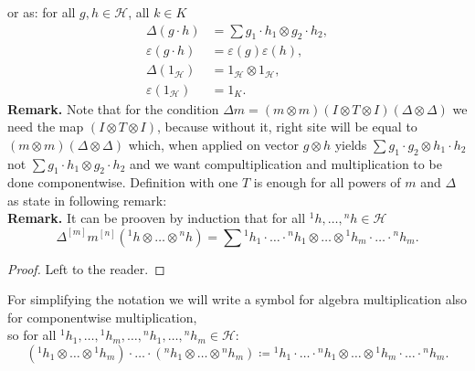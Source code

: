 \documentclass[a4paper, 12pt]{report}
\begin{document}
or as: for all $g, h \in \mathcal{H}$, all $k \in K$
\begin{align*}
\Delta(g \cdot h) &= \sum g_1 \cdot h_1 \otimes g_2 \cdot h_2, \\
\varepsilon(g \cdot h) &= \varepsilon(g)\varepsilon(h), \\
\Delta (1_\mathcal{H}) &= 1_\mathcal{H} \otimes 1_\mathcal{H}, \\
\varepsilon (1_\mathcal{H}) &= 1_K.
\end{align*}
\textbf{Remark. } Note that for the condition
$\Delta m = (m\otimes m)(I \otimes T \otimes I)(\Delta \otimes \Delta)$
we need the map $(I \otimes T \otimes I)$, because without it, right site will be equal to
$(m \otimes m)(\Delta \otimes \Delta)$ which, when applied on vector $g \otimes h$ yields
$\displaystyle\sum g_1 \cdot g_2 \otimes h_1 \cdot h_2$ not $\sum g_1 \cdot h_1 \otimes g_2 \cdot h_2$
and we want compultiplication and multiplication to be done componentwise. Definition with
one $T$ is enough for all powers of $m$ and $\Delta$ as state in following remark:\\
\textbf{Remark. } It can be prooven by induction that for all ${^1h}, \dots, {^nh} \in \mathcal{H}$
\begin{equation}
\Delta^{[m]}m^{[n]}({^1h} \otimes \dots \otimes {^nh}) = \sum {^1h}_1 \cdot \ldots \cdot {^nh}_1
\otimes \dots \otimes {^1h}_m\cdot  \ldots \cdot {^nh}_m.
\end{equation}
\begin{proof}
Left to the reader.
\end{proof}
For simplifying the notation we will write a symbol for algebra multiplication also for componentwise 
multiplication, \\ so for all ${^1h}_1, \dots, {^1h}_m, \dots, {^nh}_1, \dots , {^nh}_m \in \mathcal{H}$:
\begin{equation}
({^1h}_1\otimes \dots \otimes {^1h}_m)\cdot \ldots \cdot ({^nh}_1 \otimes \dots \otimes {^nh}_m) \coloneqq 
{^1h}_1 \cdot \ldots \cdot {^nh}_1 \otimes \dots \otimes {^1h}_m\cdot  \ldots \cdot {^nh}_m.
\end{equation}
\end{document}
